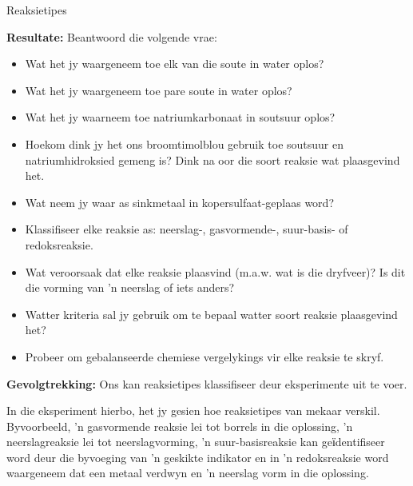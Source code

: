 \begin{g_experiment}{Reaksietipes}
\begin{minipage}{0.9\textwidth}
\end{minipage}
\par 
\label{m38719*eip-1903}\noindent{}\textbf{Resultate: }\newline
Beantwoord die volgende vrae:\\
\label{m38719*id6144}
\begin{minipage}{0.9\textwidth}
\begin{itemize}[noitemsep]
\item Wat het jy waargeneem toe elk van die soute in water oplos?
\item Wat het jy waargeneem toe pare soute in water oplos?
\item Wat het jy waarneem toe natriumkarbonaat in soutsuur oplos?
\item Hoekom dink jy het ons broomtimolblou gebruik toe soutsuur en natriumhidroksied gemeng is? Dink na oor die soort reaksie wat plaasgevind het.
\item Wat neem jy waar as sinkmetaal in kopersulfaat-geplaas word?
\item Klassifiseer elke reaksie as: neerslag-, gasvormende-, suur-basis- of redoksreaksie.
\item Wat veroorsaak dat elke reaksie plaasvind (m.a.w. wat is die dryfveer)? Is dit die vorming van 'n neerslag of iets anders?
\item Watter kriteria sal jy gebruik om te bepaal watter soort reaksie plaasgevind het?
\item Probeer om gebalanseerde chemiese vergelykings vir elke reaksie te skryf.
\end{itemize}
\end{minipage}
\par 
\label{m38719*eip-1904}\noindent{}\textbf{Gevolgtrekking: }\newline
Ons kan reaksietipes klassifiseer deur eksperimente uit te voer.
\end{g_experiment}
In die eksperiment hierbo, het jy gesien hoe reaksietipes van mekaar verskil. Byvoorbeeld, 'n gasvormende reaksie lei tot borrels in die oplossing, 'n neerslagreaksie lei tot  neerslagvorming, 'n suur-basisreaksie kan geїdentifiseer word deur die byvoeging van 'n  geskikte indikator en in 'n redoksreaksie word waargeneem dat een metaal verdwyn en 'n neerslag vorm in die oplossing.\par  
\label{m38719*eip-796}
            \nopagebreak
